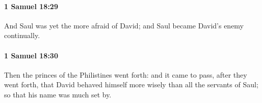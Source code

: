		\paragraph{1 Samuel 18:29} %
			\label{1SAMUEL-18-29}

			And Saul was yet the more afraid of David; and Saul became David’s enemy continually.


		\paragraph{1 Samuel 18:30} %
			\label{1SAMUEL-18-30}

			Then the princes of the Philistines went forth: and it came to pass, after they went forth, that David behaved himself more wisely than all the servants of Saul; so that his name was much set by.

